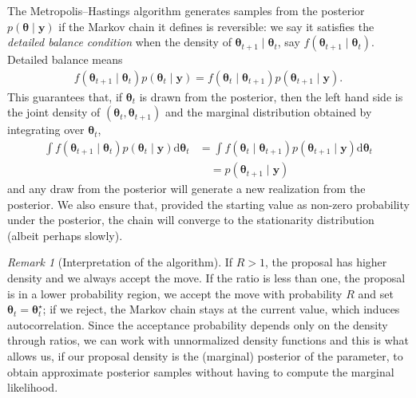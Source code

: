 \documentclass[
  11pt,
  letterpaper,
]{scrbook}
\theoremstyle{definition}
\theoremstyle{plain}
\theoremstyle{plain}
\theoremstyle{definition}
\theoremstyle{definition}
\theoremstyle{remark}
\newtheorem*{remark}{Remark}
\begin{document}
The Metropolis--Hastings algorithm generates samples from the posterior
\(p(\boldsymbol{\theta} \mid \boldsymbol{y})\) if the Markov chain it
defines is reversible: we say it satisfies the \emph{detailed balance
condition} when the density of
\(\boldsymbol{\theta}_{t+1} \mid \boldsymbol{\theta}_{t}\), say
\(f(\boldsymbol{\theta}_{t+1} \mid \boldsymbol{\theta}_{t})\). Detailed
balance means \begin{align*}
f(\boldsymbol{\theta}_{t+1} \mid \boldsymbol{\theta}_{t})p(\boldsymbol{\theta}_{t} \mid \boldsymbol{y}) = f(\boldsymbol{\theta}_{t} \mid \boldsymbol{\theta}_{t+1})p(\boldsymbol{\theta}_{t+1} \mid \boldsymbol{y}).
\end{align*} This guarantees that, if \(\boldsymbol{\theta}_{t}\) is
drawn from the posterior, then the left hand side is the joint density
of \((\boldsymbol{\theta}_{t}, \boldsymbol{\theta}_{t+1})\) and the
marginal distribution obtained by integrating over
\(\boldsymbol{\theta}_{t}\), \begin{align*}
\int f(\boldsymbol{\theta}_{t+1} \mid \boldsymbol{\theta}_{t})p(\boldsymbol{\theta}_{t} \mid \boldsymbol{y})\mathrm{d} \boldsymbol{\theta}_{t}
& = \int f(\boldsymbol{\theta}_{t} \mid \boldsymbol{\theta}_{t+1})p(\boldsymbol{\theta}_{t+1} \mid \boldsymbol{y})\mathrm{d} \boldsymbol{\theta}_{t} 
\\&\quad= p(\boldsymbol{\theta}_{t+1} \mid \boldsymbol{y})
\end{align*} and any draw from the posterior will generate a new
realization from the posterior. We also ensure that, provided the
starting value as non-zero probability under the posterior, the chain
will converge to the stationarity distribution (albeit perhaps slowly).

\begin{remark}[Interpretation of the algorithm]
If \(R>1\), the proposal has higher density and we always accept the
move. If the ratio is less than one, the proposal is in a lower
probability region, we accept the move with probability \(R\) and set
\(\boldsymbol{\theta}_{t}=\boldsymbol{\theta}^{\star}_t\); if we reject,
the Markov chain stays at the current value, which induces
autocorrelation. Since the acceptance probability depends only on the
density through ratios, we can work with unnormalized density functions
and this is what allows us, if our proposal density is the (marginal)
posterior of the parameter, to obtain approximate posterior samples
without having to compute the marginal likelihood.
\end{remark}
\end{document}
